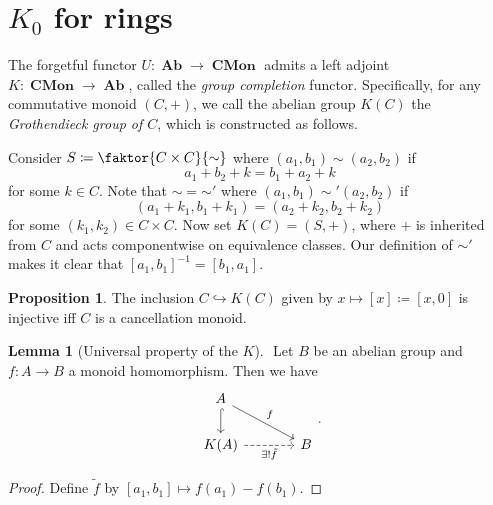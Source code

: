 \documentclass[10pt,letterpaper,cm]{nupset}
\theoremstyle{definition}
\theoremstyle{theorem}
\newtheorem{lemma}[definition]{Lemma}
\newtheorem{prop}[definition]{Proposition}
\theoremstyle{remark}
\newcommand{\1}{\mathbf{1}}
\newcommand{\0}{\vec 0}
\DeclareMathOperator{\Ab}{\mathbf{Ab}}
\DeclareMathOperator{\Cmon}{\mathbf{CMon}}
\begin{document}
\begin{abstract}
We begin low-dimensional $K$-theory, which consists of the groups $K_0(-)$, $K_1(-)$, and $K_2(-)$. Specifically, we describe $K_0$ for rings and for topological spaces. The main sources for this talk are the following.
\begin{itemize}
\item $n$Lab.
\item Charles Weibel's \textit{The $K$-book: an introduction to algebraic $K$-theory}, Chapters I and II.
\item Eric M. Friedlander's \textit{An Introduction to $K$-theory}, Chapter 1.
\end{itemize}
\end{abstract}

\smallskip

\section{$K_0$ for rings}

The forgetful functor $U: \Ab \to \Cmon$ admits a left adjoint $K: \Cmon \to \Ab$, called the \textit{group completion} functor. Specifically, for any commutative monoid $\left(C, +\right)$, we call the abelian group $K(C)$ the \textit{Grothendieck group of $C$}, which is constructed as follows.

\medskip

 Consider $S\coloneqq \faktor{C \times C}{\sim}$ where $(a_1, b_1) \sim (a_2, b_2)$ if $$a_1 + b_2 +k = b_1 + a_2 +k$$ for some $k\in C$. Note that $\sim = {\sim'}$ where $(a_1, b_1) \sim' (a_2, b_2)$ if $$\left(a_1 + k_1, b_1 + k_1\right) = \left(a_2 +k_2, b_2 + k_2\right)$$ for some $\left(k_1, k_2\right) \in C\times C$. Now set $K(C) = \left(S, +\right)$, where $+$ is inherited from $C$ and acts componentwise on equivalence classes. Our definition of ${\sim'}$ makes it clear that $\left[a_1, b_1\right]^{{-1}} = \left[b_1, a_1\right]$.

\begin{prop}
The inclusion $C \hookrightarrow K(C)$ given by $x \mapsto \left[x\right]\coloneqq \left[x, 0\right]$ is injective iff $C$ is a cancellation monoid.
\end{prop}

\begin{lemma}[Universal property of the $K$] $ $
Let $B$ be an abelian group and $f: A \to B$ a monoid homomorphism. Then we have 
\[
\begin{tikzcd}[column sep=large]
A \arrow[rd, "f"] \arrow[d, hook] &  \\
K(A) \arrow[swap, r, "\exists! \tilde{f}", dashed] & B
\end{tikzcd}.
\]
\end{lemma}
\begin{proof}
Define $\tilde{f}$ by $\left[a_1, b_1\right]\mapsto f(a_1) - f(b_1)$.
\end{proof}
\end{document}
